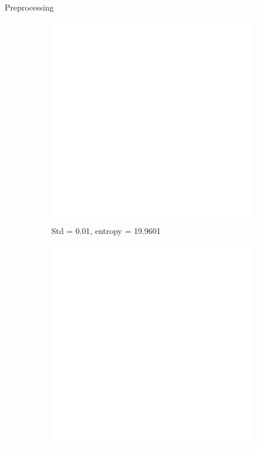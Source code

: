 \documentclass[aspectratio=1610]{beamer}
\begin{document}
\begin{frame}{Preprocessing}
  
  \begin{figure}
    \centering
    \begin{subfigure}[t]{0.3\textwidth}
        \includegraphics[width=\textwidth]{images/g_noise_low.png}
        \caption{Std = 0.01, \break entropy = 19.9601}
        \label{fig:noisy1}
    \end{subfigure}
    \begin{subfigure}[t]{0.3\textwidth}
        \includegraphics[width=\textwidth]{images/g_noise_mid.png}

\end{subfigure}
\end{figure}
\end{frame}
\end{document}
